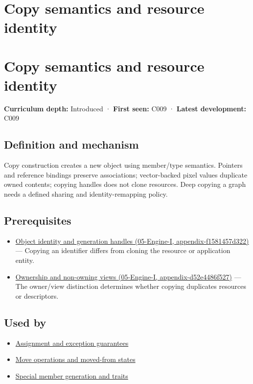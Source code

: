 \hypertarget{appendix-1340cd1ce582}{}
\section*{Copy semantics and resource identity}
\section{Copy semantics and resource identity}\label{appendix-1340cd1ce582-copy-semantics-and-resource-identity}

\textbf{Curriculum depth:} Introduced · \textbf{First seen:} C009 · \textbf{Latest development:} C009

\subsection{Definition and mechanism}\label{appendix-1340cd1ce582-definition-and-mechanism}

Copy construction creates a new object using member/type semantics. Pointers and reference bindings preserve associations; vector-backed pixel values duplicate owned contents; copying handles does not clone resources. Deep copying a graph needs a defined sharing and identity-remapping policy.

\subsection{Prerequisites}\label{appendix-1340cd1ce582-prerequisites}

\begin{itemize}
\tightlist
\item
  \href{../05-Engine-I/main.pdf\#nameddest=appendix-f1581457d322}{Object identity and generation handles (05-Engine-I, appendix-f1581457d322)} --- Copying an identifier differs from cloning the resource or application entity.
\item
  \href{../05-Engine-I/main.pdf\#nameddest=appendix-d52e4486f527}{Ownership and non-owning views (05-Engine-I, appendix-d52e4486f527)} --- The owner/view distinction determines whether copying duplicates resources or descriptors.
\end{itemize}

\subsection{Used by}\label{appendix-1340cd1ce582-used-by}

\begin{itemize}
\tightlist
\item
  \hyperref[appendix-bea6beb5350f]{Assignment and exception guarantees}
\item
  \hyperref[appendix-5636651017c2]{Move operations and moved-from states}
\item
  \hyperref[appendix-42e02a12c694]{Special member generation and traits}
\end{itemize}

